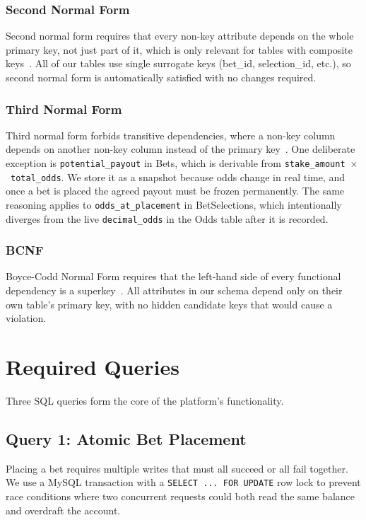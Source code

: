 \documentclass[sigconf,nonacm]{acmart}
\begin{document}
\subsubsection{Second Normal Form}
Second normal form requires that every non-key attribute depends on the
whole primary key, not just part of it, which is only relevant for tables with
composite keys~\cite{gomstyn2024dbnorm}. All of our tables use single
surrogate keys (bet\_id, selection\_id, etc.), so second normal form is
automatically satisfied with no changes required.

\subsubsection{Third Normal Form}
Third normal form forbids transitive dependencies, where a non-key
column depends on another non-key column instead of the primary
key~\cite{gomstyn2024dbnorm}. One deliberate exception is
\texttt{potential\_payout} in Bets, which is derivable from
\texttt{stake\_amount}~$\times$~\texttt{total\_odds}. We store it as
a snapshot because odds change in real time, and once a bet is placed
the agreed payout must be frozen permanently. The same reasoning
applies to \texttt{odds\_at\_placement} in BetSelections, which
intentionally diverges from the live \texttt{decimal\_odds} in the
Odds table after it is recorded.

\subsubsection{BCNF}
Boyce-Codd Normal Form requires that the left-hand side of every
functional dependency is a superkey~\cite{gomstyn2024dbnorm}. All
attributes in our schema depend only on their own table's primary key,
with no hidden candidate keys that would cause a violation.

\section{Required Queries}

Three SQL queries form the core of the platform's functionality.

\subsection{Query 1: Atomic Bet Placement}
Placing a bet requires multiple writes that must all succeed or all
fail together. We use a MySQL transaction with a
\texttt{SELECT~...~FOR~UPDATE} row lock to prevent race conditions
where two concurrent requests could both read the same balance and
overdraft the account.
\end{document}
